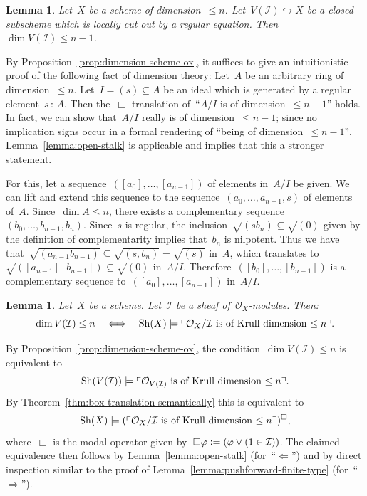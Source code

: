 \documentclass[10pt,reqno,a4paper]{amsbook}
\makeatletter
\theoremstyle{definition}
\theoremstyle{plain}
\newtheorem{lemma}[defn]{Lemma}
\theoremstyle{remark}
\renewcommand{\O}{\mathcal{O}}
\newcommand{\I}{\mathcal{I}}
\newcommand{\Sh}{\mathrm{Sh}}
\newcommand{\?}{\,{:}\,}
\renewcommand{\_}{\mathpunct{.}\,}
\newcommand{\speak}[1]{\ulcorner\text{\textnormal{#1}}\urcorner}
\newcommand{\defeq}{\vcentcolon=}
\renewenvironment{proof}[1][\proofname]{\par
  \pushQED{\qed}%
  \normalfont \topsep6\p@\@plus6\p@\relax
  \trivlist
  \item[\hskip\labelsep
        \itshape
    #1\@addpunct{.}]\ignorespaces
}{%
  \popQED\endtrivlist\@endpefalse
}
\makeatother
\begin{document}
\begin{lemma}Let~$X$ be a scheme of dimension~$\leq n$. Let~$V(\I)
\hookrightarrow X$ be a closed subscheme which is locally cut out by a regular
equation. Then~$\dim V(\I) \leq n-1$.\end{lemma}
\begin{proof}By Proposition~\ref{prop:dimension-scheme-ox}, it suffices to give
an intuitionistic proof of the following fact of dimension theory: Let~$A$ be
an arbitrary ring of dimension~$\leq n$. Let~$I = (s) \subseteq A$ be an ideal
which is generated by a regular element~$s\?A$. Then the~$\Box$-translation
of~``$A/I$ is of dimension~$\leq n-1$'' holds. In fact, we can show that~$A/I$
really is of dimension~$\leq n-1$; since no implication signs occur in a formal rendering of ``being of dimension~$\leq n-1$'',
Lemma~\ref{lemma:open-stalk} is applicable and implies
that this a stronger statement.

For this, let a sequence~$([a_0],\ldots,[a_{n-1}])$ of elements in~$A/I$ be
given. We can lift and extend this sequence to the
sequence~$(a_0,\ldots,a_{n-1},s)$ of elements of~$A$. Since~$\dim A \leq n$,
there exists a complementary sequence~$(b_0,\ldots,b_{n-1},b_n)$.
Since~$s$ is regular, the inclusion~$\sqrt{(s b_n)} \subseteq \sqrt{(0)}$
given by the definition of complementarity implies that~$b_n$ is nilpotent.
Thus we have that~$\sqrt{(a_{n-1}b_{n-1})} \subseteq \sqrt{(s,b_n)} =
\sqrt{(s)}$ in~$A$, which translates to~$\sqrt{([a_{n-1}] [b_{n-1}])} \subseteq
\sqrt{(0)}$ in~$A/I$.  Therefore~$([b_0],\ldots,[b_{n-1}])$ is a complementary
sequence to~$([a_0],\ldots,[a_{n-1}])$ in~$A/I$.
\end{proof}

\begin{lemma}\label{lemma:dim-closed-subscheme}
Let~$X$ be a scheme. Let~$\I$ be a sheaf of~$\O_X$-modules. Then:
\[ \dim V(\I) \leq n \quad\Longleftrightarrow\quad
  \Sh(X) \models \speak{$\O_X/\I$ is of Krull dimension~$\leq n$}. \]
\end{lemma}
\begin{proof}By Proposition~\ref{prop:dimension-scheme-ox}, the condition~$\dim
V(\I) \leq n$ is equivalent to
\[ \Sh(V(\I)) \models \speak{$\O_{V(\I)}$ is of Krull dimension~$\leq n$}. \]
By Theorem~\ref{thm:box-translation-semantically} this is equivalent to
\[ \Sh(X) \models (\speak{$\O_X/\I$ is of Krull dimension~$\leq n$})^\Box, \]
where~$\Box$ is the modal operator given by~$\Box\varphi \defeq (\varphi \vee
(1\in\I))$. The claimed equivalence then follows by
Lemma~\ref{lemma:open-stalk} (for~``$\Leftarrow$'') and by direct inspection
similar to the proof of Lemma~\ref{lemma:pushforward-finite-type}
(for~``$\Rightarrow$'').
\end{proof}
\end{document}

